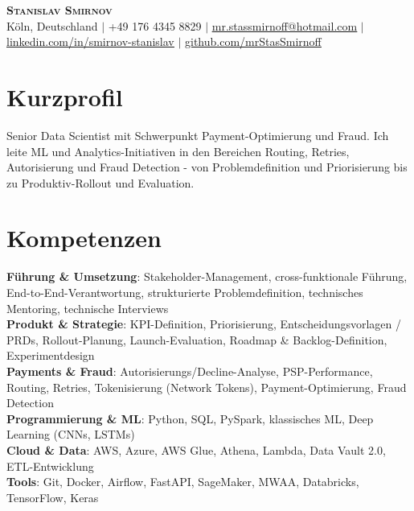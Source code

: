 \documentclass[a4paper,11pt]{article}
\begin{document}
\begin{center}
    \textbf{\Large \scshape Stanislav Smirnov} \\ \vspace{1pt}
    \small Köln, Deutschland $|$ +49 176 4345 8829 $|$ \href{mailto:mr.stassmirnoff@hotmail.com}{\underline{mr.stassmirnoff@hotmail.com}} $|$
    \href{https://www.linkedin.com/in/smirnov-stanislav/}{\underline{linkedin.com/in/smirnov-stanislav}} $|$
    \href{https://github.com/mrStasSmirnoff}{\underline{github.com/mrStasSmirnoff}}
\end{center}

\section{Kurzprofil}
Senior Data Scientist mit Schwerpunkt Payment-Optimierung und Fraud. Ich leite ML und Analytics-Initiativen in den Bereichen Routing, Retries, Autorisierung und Fraud Detection - von Problemdefinition und Priorisierung bis zu Produktiv-Rollout und Evaluation.

\section{Kompetenzen}
 \begin{itemize}[leftmargin=0.15in, label={}]
    \small{\item{
     \textbf{Führung \& Umsetzung}{: Stakeholder-Management, cross-funktionale Führung, End-to-End-Verantwortung, strukturierte Problemdefinition, technisches Mentoring, technische Interviews} \\
     \textbf{Produkt \& Strategie}{: KPI-Definition, Priorisierung, Entscheidungsvorlagen / PRDs, Rollout-Planung, Launch-Evaluation, Roadmap \& Backlog-Definition, Experimentdesign} \\
     \textbf{Payments \& Fraud}{: Autorisierungs/Decline-Analyse, PSP-Performance, Routing, Retries, Tokenisierung (Network Tokens), Payment-Optimierung, Fraud Detection} \\
     \textbf{Programmierung \& ML}{: Python, SQL, PySpark, klassisches ML, Deep Learning (CNNs, LSTMs)} \\
     \textbf{Cloud \& Data}{: AWS, Azure, AWS Glue, Athena, Lambda, Data Vault 2.0, ETL-Entwicklung} \\
     \textbf{Tools}{: Git, Docker, Airflow, FastAPI, SageMaker, MWAA, Databricks, TensorFlow, Keras}
    }}
 \end{itemize}
\end{document}
